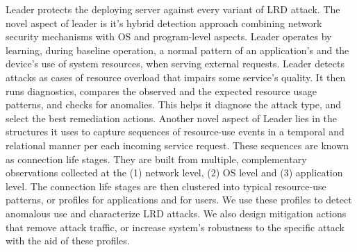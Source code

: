 \documentclass[conference]{IEEEtran}
\begin{document}
Leader protects the deploying server against every variant of LRD attack. The novel aspect of leader is it's hybrid detection approach combining network security mechanisms with OS and program-level aspects.  Leader operates by learning, during baseline operation, a normal pattern of an application’s and the device’s use of system resources, when serving external requests. Leader detects attacks as cases of resource overload that impairs some service’s quality. It then runs diagnostics, compares the observed and the expected resource usage patterns, and checks for anomalies. This helps it diagnose the attack type, and select
the best remediation actions. 
Another novel aspect of Leader lies in the structures it uses to capture sequences of resource-use events in a temporal and relational manner per each incoming service request. These sequences are known as connection life stages. They are built from multiple, complementary observations collected at the (1) network level, (2) OS level and (3) application level. The connection life stages are then clustered into typical resource-use patterns, or profiles for applications and for users. We use these profiles to detect anomalous use and characterize LRD attacks. We also design mitigation actions that remove attack traffic, or increase system’s robustness to the specific attack with the aid of these profiles.







%



%
%
\end{document}
